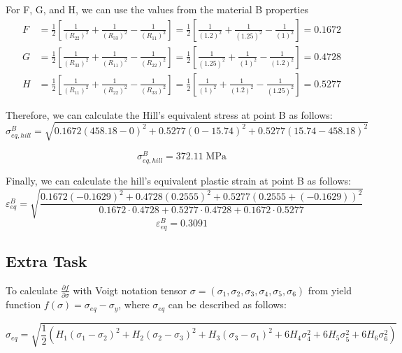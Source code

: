 \documentclass[12pt]{article}
\begin{document}
For F, G, and H, we can use the values from the material B properties
\begin{align*}
F &= \frac{1}{2} \left[ \frac{1}{(R_{22})^2} + \frac{1}{(R_{33})^2} - \frac{1}{(R_{11})^2} \right] = \frac{1}{2} \left[ \frac{1}{(1.2)^2} + \frac{1}{(1.25)^2} - \frac{1}{(1)^2} \right] = 0.1672\\
G &= \frac{1}{2} \left[ \frac{1}{(R_{33})^2} + \frac{1}{(R_{11})^2} - \frac{1}{(R_{22})^2} \right] = \frac{1}{2} \left[ \frac{1}{(1.25)^2} + \frac{1}{(1)^2} - \frac{1}{(1.2)^2} \right] = 0.4728\\
H &= \frac{1}{2} \left[ \frac{1}{(R_{11})^2} + \frac{1}{(R_{22})^2} - \frac{1}{(R_{33})^2} \right] = \frac{1}{2} \left[ \frac{1}{(1)^2} + \frac{1}{(1.2)^2} - \frac{1}{(1.25)^2} \right] = 0.5277
\end{align*}    

Therefore, we can calculate the Hill's equivalent stress at point B as follows:
\begin{equation}
    \sigma_{eq, hill}^B = \sqrt{0.1672(458.18-0)^2 + 0.5277(0-15.74)^2 + 0.5277(15.74-458.18)^2}
\end{equation}

\begin{equation}
    \sigma_{eq, hill}^B = 372.11 \;\text{MPa}
\end{equation}

Finally, we can calculate the hill's equivalent plastic strain at point B as follows:
\begin{equation}
    \varepsilon_{eq}^B = \sqrt{\frac{0.1672(-0.1629)^2 +0.4728(0.2555)^2 + 0.5277(0.2555+(-0.1629))^2}{0.1672 \cdot 0.4728 + 0.5277 \cdot 0.4728 + 0.1672 \cdot 0.5277}}
\end{equation}
\begin{equation}
    \varepsilon_{eq}^B = 0.3091
\end{equation}

\newpage
\subsection*{Extra Task}
To calculate $\frac{\partial{f}}{\partial{\sigma}}$ with Voigt notation tensor $\sigma = (\sigma_1, \sigma_2, \sigma_3, \sigma_4, \sigma_5, \sigma_6)$ from yield function 
$f(\sigma)=\sigma_{eq} - \sigma_y$, where $\sigma_{eq}$ can be described as follows:

\begin{equation}
    \sigma_{eq} = \sqrt{\frac{1}{2} \left( H_{1}(\sigma_1 - \sigma_2)^2 + H_{2}(\sigma_2 - \sigma_3)^2 + H_{3}(\sigma_3 - \sigma_1)^2 + 6H_{4}\sigma_4^2 + 6H_{5}\sigma_5^2 + 6H_{6}\sigma_6^2 \right)}
\end{equation}
\end{document}
